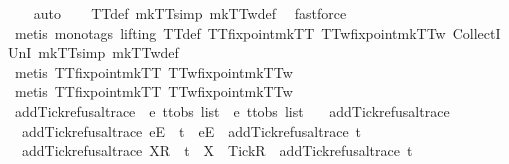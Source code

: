 \begin{isabellebody}
%
\isadelimproof
\ \ %
\endisadelimproof
%
\isatagproof
{}\isamarkupfalse%
\ auto\isanewline
\ \ \isamarkupfalse%
\ TT{}{\isacharunderscore}def\ mkTT{}{\isacharunderscore}simp\ mkTT{}w{\isacharunderscore}def\ \isamarkupfalse%
\ fastforce\isanewline
\ \ \isamarkupfalse%
\ {\isacharparenleft}metis\ {\isacharparenleft}mono{\isacharunderscore}tags{\isacharcomma}\ lifting{\isacharparenright}\ TT{}{\isacharunderscore}def\ TT{}{\isacharunderscore}fixpoint{\isacharunderscore}mkTT{}\ TT{}w{\isacharunderscore}fixpoint{\isacharunderscore}mkTT{}w\ CollectI\ UnI{}\ mkTT{}{\isacharunderscore}simp\ mkTT{}w{\isacharunderscore}def{\isacharparenright}\ \ \isanewline
\ \ \ \ \isamarkupfalse%
\ {\isacharparenleft}metis\ TT{}{\isacharunderscore}fixpoint{\isacharunderscore}mkTT{}\ TT{}w{\isacharunderscore}fixpoint{\isacharunderscore}mkTT{}w{\isacharparenright}\isanewline
\ \ \ \ \isamarkupfalse%
\ {\isacharparenleft}metis\ TT{}{\isacharunderscore}fixpoint{\isacharunderscore}mkTT{}\ TT{}w{\isacharunderscore}fixpoint{\isacharunderscore}mkTT{}w{\isacharparenright}%
\endisatagproof
{\isafoldproof}%
%
\isadelimproof
\isanewline
%
\endisadelimproof
\isanewline
{}\isamarkupfalse%
\ add{\isacharunderscore}Tick{\isacharunderscore}refusal{\isacharunderscore}trace\ {\isacharcolon}{\isacharcolon}\ {\isachardoublequoteopen}{\isacharprime}e\ ttobs\ list\ {\isasymRightarrow}\ {\isacharprime}e\ ttobs\ list{\isachardoublequoteclose}\ \isanewline
\ \ {\isachardoublequoteopen}add{\isacharunderscore}Tick{\isacharunderscore}refusal{\isacharunderscore}trace\ {\isacharbrackleft}{\isacharbrackright}\ {\isacharequal}\ {\isacharbrackleft}{\isacharbrackright}{\isachardoublequoteclose}\ {\isacharbar}\isanewline
\ \ {\isachardoublequoteopen}add{\isacharunderscore}Tick{\isacharunderscore}refusal{\isacharunderscore}trace\ {\isacharparenleft}{\isacharbrackleft}e{\isacharbrackright}\isactrlsub E\ {\isacharhash}\ t{\isacharparenright}\ {\isacharequal}\ {\isacharbrackleft}e{\isacharbrackright}\isactrlsub E\ {\isacharhash}\ add{\isacharunderscore}Tick{\isacharunderscore}refusal{\isacharunderscore}trace\ t{\isachardoublequoteclose}\ {\isacharbar}\isanewline
\ \ {\isachardoublequoteopen}add{\isacharunderscore}Tick{\isacharunderscore}refusal{\isacharunderscore}trace\ {\isacharparenleft}{\isacharbrackleft}X{\isacharbrackright}\isactrlsub R\ {\isacharhash}\ t{\isacharparenright}\ {\isacharequal}\ {\isacharbrackleft}X\ {\isasymunion}\ {\isacharbraceleft}Tick{\isacharbraceright}{\isacharbrackright}\isactrlsub R\ {\isacharhash}\ add{\isacharunderscore}Tick{\isacharunderscore}refusal{\isacharunderscore}trace\ t{\isachardoublequoteclose}\isanewline

\end{isabellebody}
